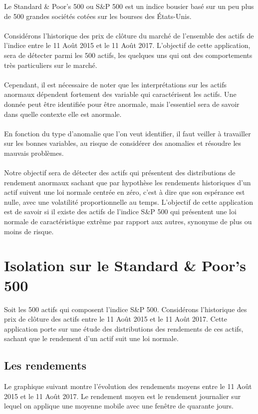 Le Standard \& Poor's 500 ou S\&P 500 est un indice bousier basé sur un peu plus de 500 grandes sociétés cotées sur les bourses des États-Unis.
\\
\\
Considérons l'historique des prix de clôture du marché de l'ensemble des actifs de l'indice entre le 11 Août 2015 et le  11 Août 2017. L'objectif de cette application, sera de détecter parmi les 500 actifs, les quelques uns qui ont des comportements très particuliers sur le marché.
\\
\\
Cependant, il est nécessaire de noter que les interprétations sur les actifs anormaux dépendent fortement des variable qui caractérisent les actifs. Une donnée peut être identifiée pour être anormale, mais l'essentiel sera de savoir dans quelle contexte elle est anormale.
\\
\\
En fonction du type d'anomalie que l'on veut identifier, il faut veiller à travailler sur les bonnes variables, au risque de considérer des anomalies et résoudre les mauvais problèmes.
\\
\\
Notre objectif sera de détecter des actifs qui présentent des distributions de rendement anormaux sachant que par hypothèse les rendements historiques d'un actif suivent une loi normale centrée en zéro, c'est à dire que son espérance est nulle, avec une volatilité proportionnelle au temps. L'objectif de cette application est de savoir si il existe des actifs de l'indice S\&P 500 qui présentent une loi normale de caractéristique extrême par rapport aux autres, synonyme de plus ou moins de risque.

\section{Isolation sur le Standard \& Poor's 500}

Soit les 500 actifs qui composent l'indice S\&P 500. 
Considérons l'historique des prix de clôture des actifs entre le 11 Août 2015 et le  11 Août 2017.
Cette application porte sur une étude des distributions des rendements de ces actifs, sachant que le rendement d'un actif suit une loi normale. 

\subsection{Les rendements}

Le graphique suivant montre l'évolution des rendements moyens entre le 11 Août 2015 et le 11 Août 2017. Le rendement moyen est le rendement journalier sur lequel on applique une moyenne mobile avec une fenêtre de quarante jours.

